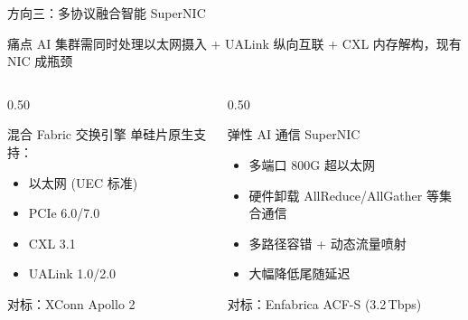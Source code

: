 \documentclass[aspectratio=169, 10pt, UTF8]{ctexbeamer}
\begin{document}
\begin{frame}{方向三：多协议融合智能 SuperNIC}
  \begin{block}{痛点}
    AI 集群需同时处理以太网摄入 + UALink 纵向互联 + CXL 内存解构，现有 NIC 成瓶颈
  \end{block}

  \begin{columns}[T]
    \begin{column}{0.50\textwidth}
      \begin{block}{混合 Fabric 交换引擎}
        单硅片原生支持：
        \begin{itemize}
          \item 以太网 (UEC 标准)
          \item PCIe 6.0/7.0
          \item CXL 3.1
          \item UALink 1.0/2.0
        \end{itemize}
        对标：XConn Apollo 2
      \end{block}
    \end{column}
    \begin{column}{0.50\textwidth}
      \begin{exampleblock}{弹性 AI 通信 SuperNIC}
        \begin{itemize}
          \item 多端口 800G 超以太网
          \item 硬件卸载 AllReduce/AllGather 等集合通信
          \item 多路径容错 + 动态流量喷射
          \item 大幅降低尾随延迟
        \end{itemize}
        对标：Enfabrica ACF-S (3.2\,Tbps)
      \end{exampleblock}
    \end{column}
  \end{columns}
\end{frame}
\end{document}
